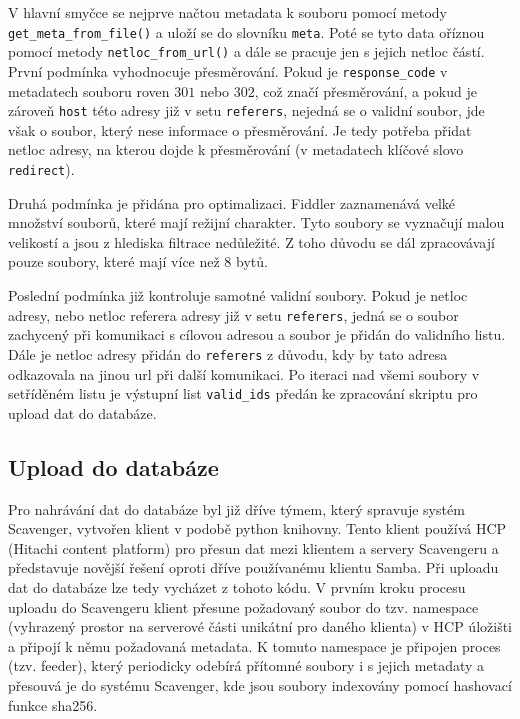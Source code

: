 \documentclass[thesis=M,czech,hidelinks]{FITthesis}[2013/05/06]
\begin{document}
V hlavní smyčce se nejprve načtou metadata k souboru pomocí metody \texttt{get_meta_from_file()} a uloží se do slovníku \texttt{meta}. Poté se tyto data oříznou pomocí metody \texttt{netloc_from_url()} a dále se pracuje jen s jejich netloc částí. První podmínka vyhodnocuje přesměrování. Pokud je \texttt{response_code} v metadatech souboru roven $301$ nebo $302$, což značí přesměrování, a pokud je zároveň \texttt{host} této adresy již v setu \texttt{referers}, nejedná se o validní soubor, jde však o soubor, který nese informace o přesměrování. Je tedy potřeba přidat netloc adresy, na kterou dojde k přesměrování (v metadatech klíčové slovo \texttt{redirect}). 

Druhá podmínka je přidána pro optimalizaci. Fiddler zaznamenává velké množství souborů, které mají režijní charakter. Tyto soubory se vyznačují malou velikostí a jsou z hlediska filtrace nedůležité. Z toho důvodu se dál zpracovávají pouze soubory, které mají více než 8 bytů.

Poslední podmínka již kontroluje samotné validní soubory. Pokud je netloc adresy, nebo netloc referera adresy již v setu \texttt{referers}, jedná se o soubor zachycený při komunikaci s cílovou adresou a soubor je přidán do validního listu. Dále je netloc adresy přidán do \texttt{referers} z důvodu, kdy by tato adresa odkazovala na jinou url při další komunikaci. Po iteraci nad všemi soubory v setříděném listu je výstupní list \texttt{valid_ids} předán ke zpracování skriptu pro upload dat do databáze.





\subsection{Upload do databáze} \label{sec:upload}
Pro nahrávání dat do databáze byl již dříve týmem, který spravuje systém Scavenger, vytvořen klient v podobě python knihovny. Tento klient používá HCP (Hitachi content platform) pro přesun dat mezi klientem a servery Scavengeru a představuje novější řešení oproti dříve používanému klientu Samba. Při uploadu dat do databáze lze tedy vycházet z tohoto kódu. V prvním kroku procesu uploadu do Scavengeru klient přesune požadovaný soubor do tzv. namespace (vyhrazený prostor na serverové části unikátní pro daného klienta) v HCP úložišti a připojí k němu požadovaná metadata. K tomuto namespace je připojen proces (tzv. feeder), který periodicky odebírá přítomné soubory i s jejich metadaty a přesouvá je do systému Scavenger, kde jsou soubory indexovány pomocí hashovací funkce sha256.
\end{document}
